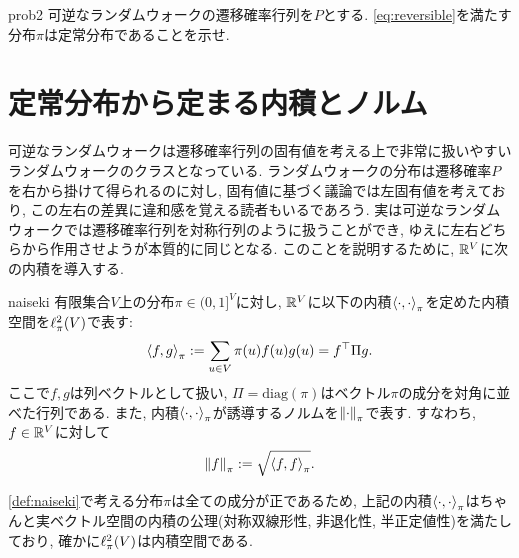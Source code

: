 \begin{exercise}{}{prob2}
    可逆なランダムウォークの遷移確率行列を$P$とする.
    \cref{eq:reversible}を満たす分布$\pi$は定常分布であることを示せ.
\end{exercise}



\section{定常分布から定まる内積とノルム}
可逆なランダムウォークは遷移確率行列の固有値を考える上で非常に扱いやすいランダムウォークのクラスとなっている.
ランダムウォークの分布は遷移確率$P$を右から掛けて得られるのに対し,
固有値に基づく議論では左固有値を考えており,
この左右の差異に違和感を覚える読者もいるであろう.
実は可逆なランダムウォークでは遷移確率行列を対称行列のように扱うことができ,
ゆえに左右どちらから作用させようが本質的に同じとなる.
このことを説明するために, $\mathbb{R}^V$に次の内積を導入する.
\begin{definition}{}{naiseki}
    有限集合$V$上の分布$\pi\in(0,1]^V$に対し,
    $\mathbb{R}^V$に以下の内積$\left\langle\cdot,\cdot\right\rangle_{\pi}$を定めた内積空間を$\ell^2_\pi(V)$で表す:
    \begin{align*}
        \left\langle f,g\right\rangle_{\pi} \mathrel{:=} \sum_{u \in V} \pi(u) f(u) g(u)
        = f^\top \Pi g.
    \end{align*}
    ここで$f,g$は列ベクトルとして扱い, $\Pi=\mathrm{diag}(\pi)$はベクトル$\pi$の成分を対角に並べた行列である.
    また, 内積$\left\langle\cdot,\cdot\right\rangle_{\pi}$が誘導するノルムを$\left\lVert\cdot\right\rVert_{\pi}$で表す.
    すなわち, $f\in\mathbb{R}^V$に対して
    \[
        \left\lVert f\right\rVert_{\pi} \mathrel{:=} \sqrt{\left\langle f,f\right\rangle_{\pi}}.
    \]
\end{definition}
\cref{def:naiseki}で考える分布$\pi$は全ての成分が正であるため,
上記の内積$\left\langle\cdot,\cdot\right\rangle_{\pi}$はちゃんと実ベクトル空間の内積の公理(対称双線形性, 非退化性, 半正定値性)を満たしており,
確かに$\ell^2_\pi(V)$は内積空間である.

